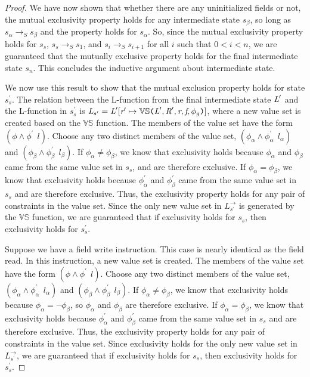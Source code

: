 \begin{proof}
We have now shown that whether there are any uninitialized fields or not, the mutual exclusivity property holds for any intermediate state $s_\beta$, so long as $s_\alpha \rightarrow_S s_\beta$ and the property holds for $s_\alpha$. 
So, since the mutual exclusivity property holds for $s_s$, $s_s \rightarrow_S s_1$, and $s_{i} \rightarrow_S s_{i+1} $ for all $i$ such that $0 < i < n$, we are guaranteed that the mutually exclusive property holds for the final intermediate state $s_n$. This concludes the inductive argument about intermediate state.

We now use this result to show that the mutual exclusion property holds for state $s_s^\prime$. The relation between the L-function from the final intermediate state $\emph{L}^\prime$ and the L-function in $s_s^\prime$ is $ \emph{L}_{s^\prime} = \emph{L}^\prime[\emph{r}^\prime \mapsto \mathbb{VS}\texttt{(} \emph{L}^\prime,\emph{R}^\prime,\emph{r},\emph{f},\phi_g\texttt{)} ]$, where a new value set is created based on the $\mathbb{VS}$ function. The members of the value set have the form $(\phi\wedge \phi^\prime\ \ l)$. Choose any two distinct members of the value set, $(\phi_\alpha \wedge \phi_\alpha^\prime\ \ l_\alpha)$ and $(\phi_\beta \wedge \phi_\beta^\prime\ \ l_\beta)$. If $\phi_\alpha \ne \phi_\beta$, we know that exclusivity holds because $\phi_\alpha$ and $\phi_\beta$ came from the same value set in $s_s$, and are therefore exclusive. If $\phi_\alpha = \phi_\beta$, we know that exclusivity holds because $\phi_\alpha^\prime$ and $\phi_\beta^\prime$ came from the same value set in $s_s$ and are therefore exclusive. Thus, the exclusivity property holds for any pair of constraints in the value set. Since the only new value set in $L_{s^\prime}^\rightarrow$ is generated by the $\mathbb{VS}$ function, we are guaranteed that if exclusivity holds for $s_s$, then exclusivity holds for $s_s^\prime$.

Suppose we have a field write instruction. This case is nearly identical as the field read. In this instruction, a new value set is created. The members of the value set have the form $(\phi\wedge \phi^\prime\ \ l)$. Choose any two distinct members of the value set, $(\phi_\alpha \wedge \phi_\alpha^\prime\ \ l_\alpha)$ and $(\phi_\beta \wedge \phi_\beta^\prime\ \ l_\beta)$. If $\phi_\alpha \ne \phi_\beta$, we know that exclusivity holds because $\phi_\alpha = \neg \phi_\beta$, so $\phi_\alpha$ and $\phi_\beta$ are therefore exclusive. If $\phi_\alpha = \phi_\beta$, we know that exclusivity holds because $\phi_\alpha^\prime$ and $\phi_\beta^\prime$ came from the same value set in $s_s$ and are therefore exclusive. Thus, the exclusivity property holds for any pair of constraints in the value set. Since exclusivity holds for the only new value set in $L_{s^\prime}^\rightarrow$, we are guaranteed that if exclusivity holds for $s_s$, then exclusivity holds for $s_s^\prime$.


\end{proof}

